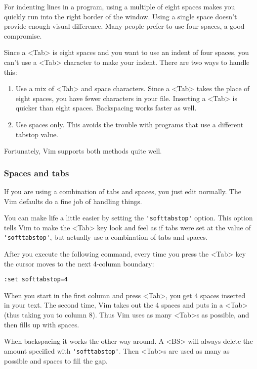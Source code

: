 For indenting lines in a program, using a multiple of eight spaces makes you quickly run into the right border of the window.
Using a single space doesn't provide enough visual difference.
Many people prefer to use four spaces, a good compromise.

Since a <Tab> is eight spaces and you want to use an indent of four spaces, you can't use a <Tab> character to make your indent.
There are two ways to handle this:

\begin{enumerate}
				\item Use a mix of <Tab> and space characters.
								Since a <Tab> takes the place of eight spaces, you have fewer characters in your file.
								Inserting a <Tab> is quicker than eight spaces.
								Backspacing works faster as well.
				\item Use spaces only.
								This avoids the trouble with programs that use a different tabstop value.
\end{enumerate}

Fortunately, Vim supports both methods quite well.
\subsubsection{Spaces and tabs}
If you are using a combination of tabs and spaces, you just edit normally.
The Vim defaults do a fine job of handling things.

You can make life a little easier by setting the \verb!'softtabstop'! option.
This option tells Vim to make the <Tab> key look and feel as if tabs were set at the value of \verb!'softtabstop'!, but actually use a combination of tabs and spaces.

After you execute the following command, every time you press the <Tab> key the cursor moves to the next 4-column boundary:

\begin{Verbatim}[samepage=true]
 :set softtabstop=4
\end{Verbatim}

When you start in the first column and press <Tab>, you get 4 spaces inserted in your text.
The second time, Vim takes out the 4 spaces and puts in a <Tab> (thus taking you to column 8).
Thus Vim uses as many <Tab>s as possible, and then fills up with spaces.

When backspacing it works the other way around.
A <BS> will always delete the amount specified with \verb!'softtabstop'!.
Then <Tab>s are used as many as possible and spaces to fill the gap.


